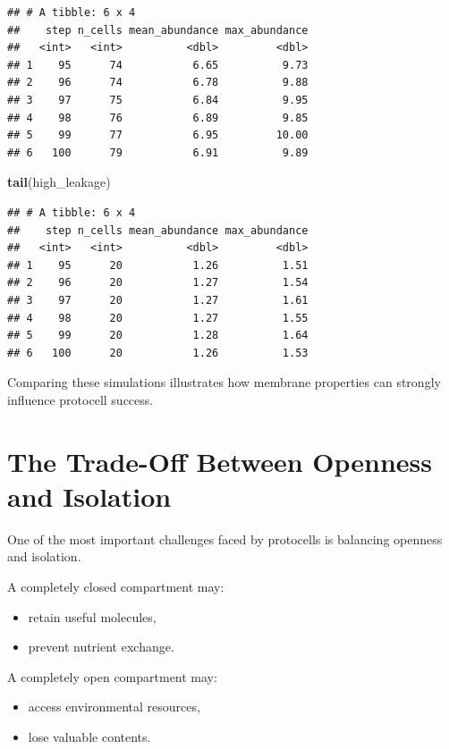 \documentclass[
  oneside,
  openany]{book}
\newenvironment{Shaded}{\begin{snugshade}}{\end{snugshade}}
\newcommand{\FunctionTok}[1]{\textcolor[rgb]{0.13,0.29,0.53}{\textbf{#1}}}
\newcommand{\NormalTok}[1]{#1}
\providecommand{\tightlist}{%
  \setlength{\itemsep}{0pt}\setlength{\parskip}{0pt}}
\begin{document}
\begin{verbatim}
## # A tibble: 6 x 4
##    step n_cells mean_abundance max_abundance
##   <int>   <int>          <dbl>         <dbl>
## 1    95      74           6.65          9.73
## 2    96      74           6.78          9.88
## 3    97      75           6.84          9.95
## 4    98      76           6.89          9.85
## 5    99      77           6.95         10.00
## 6   100      79           6.91          9.89
\end{verbatim}

\begin{Shaded}
\begin{Highlighting}[]
\FunctionTok{tail}\NormalTok{(high\_leakage)}
\end{Highlighting}
\end{Shaded}

\begin{verbatim}
## # A tibble: 6 x 4
##    step n_cells mean_abundance max_abundance
##   <int>   <int>          <dbl>         <dbl>
## 1    95      20           1.26          1.51
## 2    96      20           1.27          1.54
## 3    97      20           1.27          1.61
## 4    98      20           1.27          1.55
## 5    99      20           1.28          1.64
## 6   100      20           1.26          1.53
\end{verbatim}

Comparing these simulations illustrates how membrane properties can strongly influence protocell success.

\section{The Trade-Off Between Openness and Isolation}\label{the-trade-off-between-openness-and-isolation}

One of the most important challenges faced by protocells is balancing openness and isolation.

A completely closed compartment may:

\begin{itemize}
\tightlist
\item
  retain useful molecules,
\item
  prevent nutrient exchange.
\end{itemize}

A completely open compartment may:

\begin{itemize}
\tightlist
\item
  access environmental resources,
\item
  lose valuable contents.
\end{itemize}
\end{document}
